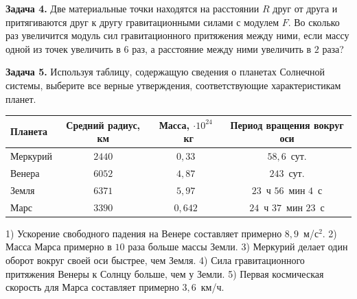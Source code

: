 \begin{taskbasic}[code={\label{task:gravity_v16_n2}}]
\textbf{Задача 4.} Две материальные точки находятся на расстоянии $R$ друг от друга и притягиваются друг к другу гравитационными силами с модулем $F$. Во сколько раз увеличится модуль сил гравитационного притяжения между ними, если массу одной из точек увеличить в $6$ раз, а расстояние между ними увеличить в $2$ раза?

\end{taskbasic}

\begin{taskbasic}[code={\label{task:gravity_v17_n5}}]
\textbf{Задача 5.} Используя таблицу, содержащую сведения о планетах Солнечной системы, выберите все верные утверждения, соответствующие характеристикам планет.
\begin{center}
\begin{tabular}{|l|c|c|c|}
\hline
\textbf{Планета} & \textbf{Средний радиус, км} & \textbf{Масса, $\cdot 10^{24}$~кг} & \textbf{Период вращения вокруг оси} \\ \hline
Меркурий & $2440$ & $0{,}33$ & $58{,}6$~сут. \\ \hline
Венера   & $6052$ & $4{,}87$ & $243$~сут. \\ \hline
Земля    & $6371$ & $5{,}97$ & $23$~ч $56$~мин $4$~с \\ \hline
Марс     & $3390$ & $0{,}642$ & $24$~ч $37$~мин $23$~с \\ \hline
\end{tabular}
\end{center}

1) Ускорение свободного падения на Венере составляет примерно $8{,}9$~м/с$^{2}$.
2) Масса Марса примерно в $10$ раза больше массы Земли.
3) Меркурий делает один оборот вокруг своей оси быстрее, чем Земля.
4) Сила гравитационного притяжения Венеры к Солнцу больше, чем у Земли.
5) Первая космическая скорость для Марса составляет примерно $3{,}6$~км/ч.

\end{taskbasic}

